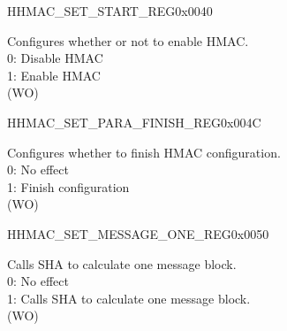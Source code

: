 \begin{register}{H}{HMAC\_SET\_START\_REG}{0x0040}\label{regdesc:HMACSETSTARTREG}
%
%
\regnewline%
\begin{regdesc}\begin{reglist}
\label{fielddesc:HMACSETSTART}\item [HMAC\_SET\_START] Configures whether or not to enable HMAC.
\\0: Disable HMAC
\\1: Enable HMAC
\\(WO)
\end{reglist}\end{regdesc}
\end{register}


\begin{register}{H}{HMAC\_SET\_PARA\_FINISH\_REG}{0x004C}\label{regdesc:HMACSETPARAFINISHREG}
%
%
\regnewline%
\begin{regdesc}\begin{reglist}
\label{fielddesc:HMACSETPARAEND}\item [HMAC\_SET\_PARA\_END] Configures whether to finish HMAC configuration.
\\0: No effect
\\1: Finish configuration
\\(WO)
\end{reglist}\end{regdesc}
\end{register}


\begin{register}{H}{HMAC\_SET\_MESSAGE\_ONE\_REG}{0x0050}\label{regdesc:HMACSETMESSAGEONEREG}
%
%
\regnewline%
\begin{regdesc}\begin{reglist}
\label{fielddesc:HMACSETTEXTONE}\item [HMAC\_SET\_TEXT\_ONE] Calls SHA to calculate one message block.
\\0: No effect
\\1: Calls SHA to calculate one message block.
\\(WO)
\end{reglist}\end{regdesc}
\end{register}


